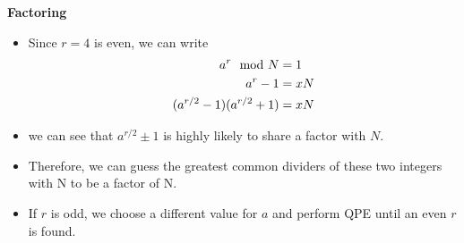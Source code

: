 \documentclass[english]{beamer}
\begin{document}
\begin{frame}{\textbf{Factoring}}

\begin{itemize}

\item	Since $r=4$ is even, we can write
\begin{align}
	a^r \mod N &=1 \notag \\
    a^r - 1 &= xN \notag  \\
    (a^{r/2}-1)(a^{r/2}+1) &= xN \notag 
\end{align}
\item we can see that $a^{r/2} \pm 1$ is highly likely to share a factor with $N$.
\item Therefore, we can guess the greatest common dividers of these two integers with N to be a factor of N.
\item If $r$ is odd, we choose a different value for $a$ and perform QPE until an even $r$ is found.
\end{itemize}

\end{frame}
\end{document}
